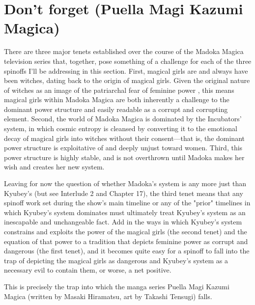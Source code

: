 \chapter{Don't forget (Puella Magi Kazumi Magica)}
There are three major tenets established over the course of the Madoka Magica television series that, together, pose something of a challenge for each of the three spinoffs I'll be addressing in this section. First, magical girls are and always have been witches, dating back to the origin of magical girls. Given the original nature of witches as an image of the patriarchal fear of feminine power \cite{ref103}, this means magical girls within Madoka Magica are both inherently a challenge to the dominant power structure and easily readable as a corrupt and corrupting element. Second, the world of Madoka Magica is dominated by the Incubators' system, in which cosmic entropy is cleansed by converting it to the emotional decay of magical girls into witches without their consent—that is, the dominant power structure is exploitative of and deeply unjust toward women. Third, this power structure is highly stable, and is not overthrown until Madoka makes her wish and creates her new system.

Leaving for now the question of whether Madoka's system is any more just than Kyubey's (but see Interlude 2 and Chapter 17), the third tenet means that any spinoff work set during the show's main timeline or any of the "prior" timelines in which Kyubey's system dominates must ultimately treat Kyubey's system as an inescapable and unchangeable fact. Add in the ways in which Kyubey's system constrains and exploits the power of the magical girls (the second tenet) and the equation of that power to a tradition that depicts feminine power as corrupt and dangerous (the first tenet), and it becomes quite easy for a spinoff to fall into the trap of depicting the magical girls as dangerous and Kyubey's system as a necessary evil to contain them, or worse, a net positive.

This is precisely the trap into which the manga series Puella Magi Kazumi Magica (written by Masaki Hiramatsu, art by Takashi Tensugi) falls.

